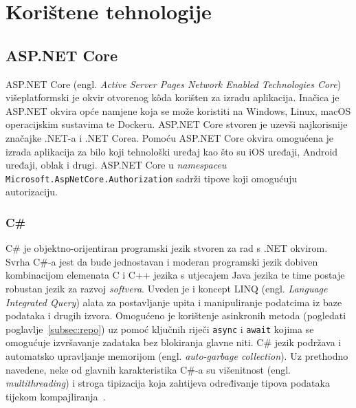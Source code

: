 \section{Korištene tehnologije}

\subsection{ASP.NET Core}

ASP.NET Core (engl. \textit{Active Server Pages Network Enabled Technologies Core}) višeplatformski je okvir otvorenog k\^oda korišten za izradu aplikacija. Inačica je ASP.NET okvira opće namjene koja se može koristiti na Windows, Linux, macOS operacijskim sustavima te Dockeru. ASP.NET Core stvoren je uzevši najkorisnije značajke .NET-a i .NET Corea. Pomoću ASP.NET Core okvira omogućena je izrada aplikacija za bilo koji tehnološki uređaj kao što su iOS uređaji, Android uređaji, oblak i drugi. ASP.NET Core u \textit{namespaceu} \texttt{Microsoft.AspNetCore.Authorization} sadrži tipove koji omogućuju autorizaciju\cite{aspNetCore}.


\subsubsection{C\#}
C\# je objektno-orijentiran programski jezik stvoren za rad s .NET okvirom. Svrha C\#-a jest da bude jednostavan i moderan programski jezik dobiven kombinacijom elemenata C i C++ jezika s utjecajem Java jezika te time postaje robustan jezik za razvoj \textit{softvera}. Uveden je i koncept LINQ (engl. \textit{Language Integrated Query}) alata za postavljanje upita i manipuliranje podatcima iz baze podataka i drugih izvora. Omogućeno je korištenje asinkronih metoda (pogledati poglavlje~\ref{subsec:repo}) uz pomoć ključnih riječi \texttt{async} i \texttt{await} kojima se omogućuje izvršavanje zadataka bez blokiranja glavne niti. C\# jezik podržava i automatsko upravljanje memorijom (engl. \textit{auto-garbage collection}). Uz prethodno navedene, neke od glavnih karakteristika C\#-a su višenitnost (engl. \textit{multithreading}) i stroga tipizacija koja zahtijeva određivanje tipova podataka tijekom kompajliranja~\cite{cSharp}.

